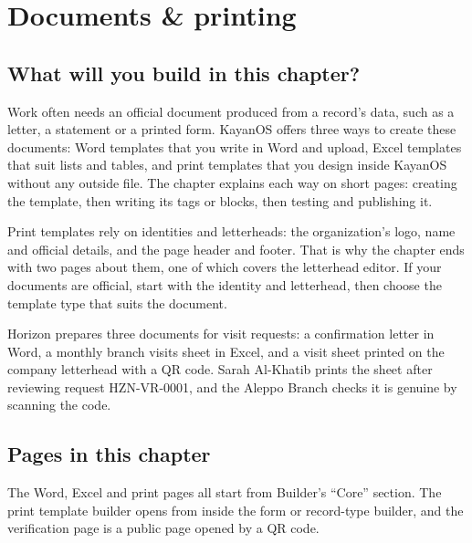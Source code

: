 \chapter{Documents \& printing}
\label{ch:builder-documents}

\section{What will you build in this chapter?}
\label{sec:builder-documents-intro}

Work often needs an official document produced from a record's data, such as a letter, a statement or a printed form. KayanOS offers three ways to create these documents: Word templates that you write in Word and upload, Excel templates that suit lists and tables, and print templates that you design inside KayanOS without any outside file. The chapter explains each way on short pages: creating the template, then writing its tags or blocks, then testing and publishing it.

Print templates rely on identities and letterheads: the organization's logo, name and official details, and the page header and footer. That is why the chapter ends with two pages about them, one of which covers the letterhead editor. If your documents are official, start with the identity and letterhead, then choose the template type that suits the document.

\begin{rcnote}
Horizon prepares three documents for visit requests: a confirmation letter in Word, a monthly branch visits sheet in Excel, and a visit sheet printed on the company letterhead with a QR code. Sarah Al-Khatib prints the sheet after reviewing request HZN-VR-0001, and the Aleppo Branch checks it is genuine by scanning the code.
\end{rcnote}

\section{Pages in this chapter}
\label{sec:builder-documents-pages}

The Word, Excel and print pages all start from Builder's “Core” section. The print template builder opens from inside the form or record-type builder, and the verification page is a public page opened by a QR code.

